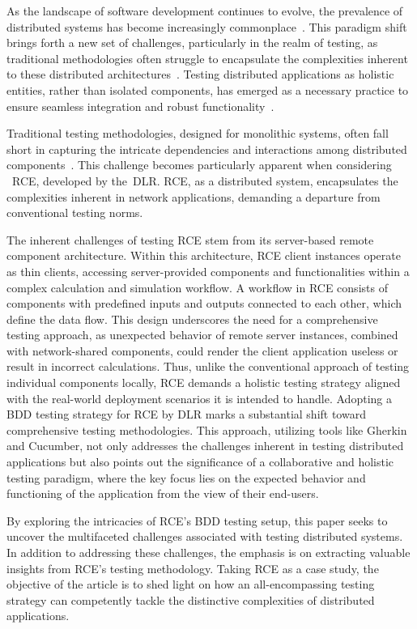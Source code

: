 As the landscape of software development continues to evolve, the prevalence of distributed systems has become increasingly commonplace~\cite{Xingang2018,Feldman1978}. This paradigm shift brings forth a new set of challenges, particularly in the realm of testing, as traditional methodologies often struggle to encapsulate the complexities inherent to these distributed architectures~\cite{Liu,Lima2017}. Testing distributed applications as holistic entities, rather than isolated components, has emerged as a necessary practice to ensure seamless integration and robust functionality~\cite{Liu,Lima2017}.

Traditional testing methodologies, designed for monolithic systems, often fall short in capturing the intricate dependencies and interactions among distributed components~\cite{Liu,Lima2017}. This challenge becomes particularly apparent when considering ~\ac{RCE}, developed by the~\ac{DLR}. \ac{RCE}, as a distributed system, encapsulates the complexities inherent in network applications, demanding a departure from conventional testing norms.

The inherent challenges of testing \ac{RCE} stem from its server-based remote component architecture. Within this architecture, \ac{RCE} client instances operate as thin clients, accessing server-provided components and functionalities within a complex calculation and simulation workflow. A workflow in \ac{RCE} consists of components with predefined inputs and outputs connected to each other, which define the data flow. This design underscores the need for a comprehensive testing approach, as unexpected behavior of remote server instances, combined with network-shared components, could render the client application useless or result in incorrect calculations. Thus, unlike the conventional approach of testing individual components locally, \ac{RCE} demands a holistic testing strategy aligned with the real-world deployment scenarios it is intended to handle. Adopting a \acf{BDD} testing strategy for \ac{RCE} by \ac{DLR} marks a substantial shift toward comprehensive testing methodologies. This approach, utilizing tools like Gherkin and Cucumber, not only addresses the challenges inherent in testing distributed applications but also points out the significance of a collaborative and holistic testing paradigm, where the key focus lies on the expected behavior and functioning of the application from the view of their end-users.

By exploring the intricacies of \ac{RCE}'s BDD testing setup, this paper seeks to uncover the multifaceted challenges associated with testing distributed systems. In addition to addressing these challenges, the emphasis is on extracting valuable insights from \ac{RCE}'s testing methodology. Taking \ac{RCE} as a case study, the objective of the article is to shed light on how an all-encompassing testing strategy can competently tackle the distinctive complexities of distributed applications. 

